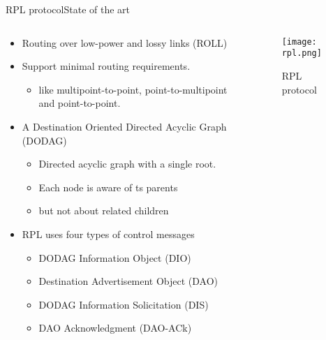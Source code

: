 \begin{frame}{RPL protocol}{State of the art}
	\begin{columns}
		
		\begin{column}{0.5\textwidth}
		
			\begin{itemize}
				\item Routing over low-power and lossy links (ROLL)
				\item Support minimal routing requirements.
					\begin{itemize}
						\item like multipoint-to-point, point-to-multipoint and point-to-point.
					\end{itemize}
				\item A Destination Oriented Directed Acyclic Graph (DODAG)
					\begin{itemize}
						\item Directed acyclic graph with a single root.
						\item Each node is aware of ts parents 
						\item but not about related children
					\end{itemize}
				\item RPL uses four types of control messages
					\begin{itemize}
						\item DODAG Information Object (DIO)
						\item Destination Advertisement Object (DAO)
						\item DODAG Information Solicitation (DIS)
						\item DAO Acknowledgment (DAO-ACk)
					\end{itemize}
			\end{itemize}
			
		\end{column}
		
		\begin{column}{0.5\textwidth}
			\begin{center}
			
				\begin{figure}
					\texttt{[image: rpl.png]}
					\caption{\label{fig:rpl} RPL protocol}
				\end{figure}
				

\end{center}
\end{column}
\end{columns}
\end{frame}
